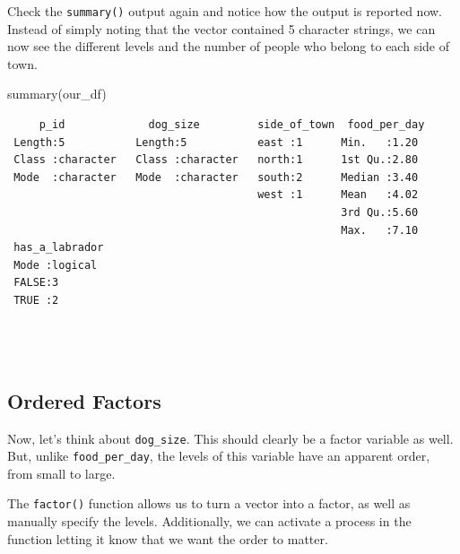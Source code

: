 \documentclass[
  letterpaper,
  DIV=11,
  numbers=noendperiod]{scrreprt}
\newenvironment{Shaded}{\begin{snugshade}}{\end{snugshade}}
\newcommand{\AttributeTok}[1]{\textcolor[rgb]{0.40,0.45,0.13}{#1}}
\newcommand{\ConstantTok}[1]{\textcolor[rgb]{0.56,0.35,0.01}{#1}}
\newcommand{\FunctionTok}[1]{\textcolor[rgb]{0.28,0.35,0.67}{#1}}
\newcommand{\NormalTok}[1]{\textcolor[rgb]{0.00,0.23,0.31}{#1}}
\newcommand{\OtherTok}[1]{\textcolor[rgb]{0.00,0.23,0.31}{#1}}
\newcommand{\SpecialCharTok}[1]{\textcolor[rgb]{0.37,0.37,0.37}{#1}}
\newcommand{\StringTok}[1]{\textcolor[rgb]{0.13,0.47,0.30}{#1}}
\begin{document}
Check the \texttt{summary()} output again and notice how the output is
reported now. Instead of simply noting that the vector contained 5
character strings, we can now see the different levels and the number of
people who belong to each side of town.

\begin{Shaded}
\begin{Highlighting}[]
\FunctionTok{summary}\NormalTok{(our\_df)}
\end{Highlighting}
\end{Shaded}

\begin{verbatim}
     p_id             dog_size         side_of_town  food_per_day 
 Length:5           Length:5           east :1      Min.   :1.20  
 Class :character   Class :character   north:1      1st Qu.:2.80  
 Mode  :character   Mode  :character   south:2      Median :3.40  
                                       west :1      Mean   :4.02  
                                                    3rd Qu.:5.60  
                                                    Max.   :7.10  
 has_a_labrador 
 Mode :logical  
 FALSE:3        
 TRUE :2        
                
                
                
\end{verbatim}

\subsection{Ordered Factors}\label{ordered-factors}

Now, let's think about \texttt{dog\_size}. This should clearly be a
factor variable as well. But, unlike \texttt{food\_per\_day}, the levels
of this variable have an apparent order, from small to large.

The \texttt{factor()} function allows us to turn a vector into a factor,
as well as manually specify the levels. Additionally, we can activate a
process in the function letting it know that we want the order to
matter.

\begin{Shaded}
\end{Shaded}
\end{document}
